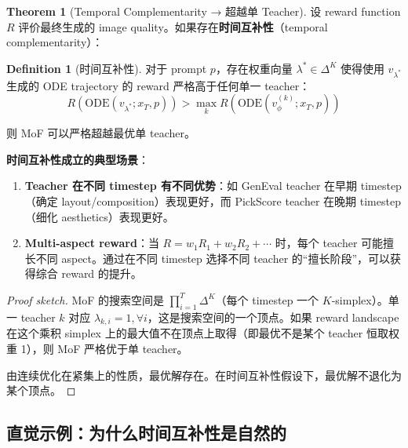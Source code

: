 \documentclass[11pt,a4paper]{article}
\newcommand{\vphi}{v_\phi}
\theoremstyle{definition}
\newtheorem{definition}{Definition}
\newtheorem{theorem}{Theorem}
\begin{document}
\begin{theorem}[Temporal Complementarity → 超越单 Teacher]
\label{thm:beyond_single}
设 reward function $R$ 评价最终生成的 image quality。如果存在\textbf{时间互补性}（temporal complementarity）：

\begin{definition}[时间互补性]
对于 prompt $p$，存在权重向量 $\lambda^* \in \Delta^K$ 使得使用 $v_{\lambda^*}$ 生成的 ODE trajectory 的 reward 严格高于任何单一 teacher：
\begin{equation}
R\!\left(\mathrm{ODE}(v_{\lambda^*}; x_T, p)\right) > \max_k R\!\left(\mathrm{ODE}(\vphi^{(k)}; x_T, p)\right)
\end{equation}
\end{definition}

则 MoF 可以严格超越最优单 teacher。

\textbf{时间互补性成立的典型场景}：
\begin{enumerate}[leftmargin=1.5em]
\item \textbf{Teacher 在不同 timestep 有不同优势}：如 GenEval teacher 在早期 timestep（确定 layout/composition）表现更好，而 PickScore teacher 在晚期 timestep（细化 aesthetics）表现更好。
\item \textbf{Multi-aspect reward}：当 $R = w_1 R_1 + w_2 R_2 + \cdots$ 时，每个 teacher 可能擅长不同 aspect。通过在不同 timestep 选择不同 teacher 的``擅长阶段''，可以获得综合 reward 的提升。
\end{enumerate}
\end{theorem}

\begin{proof}[Proof sketch]
MoF 的搜索空间是 $\prod_{i=1}^T \Delta^K$（每个 timestep 一个 $K$-simplex）。单一 teacher $k$ 对应 $\lambda_{k,i} = 1, \forall i$，这是搜索空间的一个顶点。如果 reward landscape 在这个乘积 simplex 上的最大值不在顶点上取得（即最优不是某个 teacher 恒取权重 1），则 MoF 严格优于单 teacher。

由连续优化在紧集上的性质，最优解存在。在时间互补性假设下，最优解不退化为某个顶点。
\end{proof}

\subsection{直觉示例：为什么时间互补性是自然的}
\end{document}
